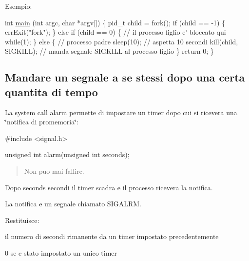 Esempio\+: 
\begin{DoxyCode}
\textcolor{keywordtype}{int} \hyperlink{client_8c_a0ddf1224851353fc92bfbff6f499fa97}{main} (\textcolor{keywordtype}{int} argc, \textcolor{keywordtype}{char} *argv[]) \{
    pid\_t child = fork();
    \textcolor{keywordflow}{if} (child == -1) \{
        errExit(\textcolor{stringliteral}{"fork"});
    \}
    \textcolor{keywordflow}{else} \textcolor{keywordflow}{if} (child == 0) \{
        \textcolor{comment}{// il processo figlio e' bloccato qui}
        \textcolor{keywordflow}{while}(1);
    \}
    \textcolor{keywordflow}{else} \{
        \textcolor{comment}{// processo padre}
        sleep(10); \textcolor{comment}{// aspetta 10 secondi}
        kill(child, SIGKILL); \textcolor{comment}{// manda segnale SIGKILL al processo figlio}
    \}
    \textcolor{keywordflow}{return} 0;
\}
\end{DoxyCode}


\subsection*{Mandare un segnale a se stessi dopo una certa quantita\textquotesingle{} di tempo}

La system call alarm permette di impostare un timer dopo cui si ricevera\textquotesingle{} una \char`\"{}notifica di promemoria\char`\"{}\+:


\begin{DoxyCode}
\textcolor{preprocessor}{#include <signal.h>}

\textcolor{keywordtype}{unsigned} \textcolor{keywordtype}{int} alarm(\textcolor{keywordtype}{unsigned} \textcolor{keywordtype}{int} seconds);
\end{DoxyCode}
 \begin{quote}
Non puo\textquotesingle{} mai fallire. \end{quote}


Dopo {\ttfamily seconds} secondi il timer scadra\textquotesingle{} e il processo ricevera\textquotesingle{} la notifica.

La notifica e\textquotesingle{} un segnale chiamato {\ttfamily S\+I\+G\+A\+L\+RM}.

Restituisce\+:
\begin{DoxyItemize}
\item il numero di secondi rimanente da un timer impostato precedentemente
\item 0 se e\textquotesingle{} stato impostato un unico timer
\end{DoxyItemize}

